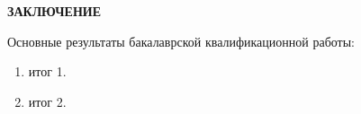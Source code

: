 \newpage
\begin{center}
  \textbf{\large ЗАКЛЮЧЕНИЕ}
\end{center}


Основные результаты бакалаврской квалификационной работы:
\begin{enumerate}

\item итог 1.

\item итог 2.

\end{enumerate}
